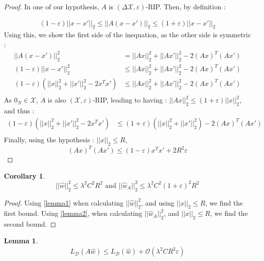 \documentclass{article}
\newtheorem{corollary}{Corollary}[theorem]
\newtheorem{lemma}[theorem]{Lemma}
\begin{document}
    \begin{proof}
        In one of our hypothesis, $A$ is $(\Delta \mathcal{X}, \varepsilon)$-RIP. 
        Then, by definition : 

        \begin{align*}
            (1-\varepsilon) ||x-x'||_2 
            \leq ||A(x-x')||_2
            \leq (1+\varepsilon) ||x-x'||_2 
        \end{align*}
        Using this, we show the first side of the inequation, 
        as the other side is symmetric :
        \begin{align*}
            ||A(x-x')||_2^2 &= ||Ax||^2_2  + ||Ax'||^2_2 - 2 (Ax)^T(Ax') \\
            (1-\varepsilon) ||x-x'||^2_2 &\leq ||Ax||^2_2  + ||Ax'||^2_2 - 2 (Ax)^T(Ax') \\
            (1-\varepsilon) (||x||^2_2+||x'||^2_2 -2x^T x') 
            &\leq ||Ax||^2_2  + ||Ax'||^2_2 - 2 (Ax)^T(Ax') \\
        \end{align*}
        As $0_N \in \mathcal{X}$, $A$ is also $(\mathcal{X},
         \varepsilon)$-RIP, leading to having :
        $||Ax||^2_2 \leq (1+\varepsilon)||x||^2_2$, and thus :
        \begin{align*}
            (1-\varepsilon) (||x||^2_2+||x'||^2_2 -2x^T x') 
            &\leq (1+\varepsilon)(||x||^2_2  + ||x'||^2_2) - 2 (Ax)^T(Ax') \\
        \end{align*}
        Finally, using the hypothesis : $||x||_2 \leq R$, 
        \[  (Ax)^T(Ax') \leq (1-\varepsilon)x^Tx' + 2R^2\varepsilon \]
    \end{proof}
    \begin{corollary}
        \[
            ||\hat{w}||_2^2 
            \leq \lambda^2 C^2 R^2 \text{ and }
            ||\hat{w}_A||_2^2 
            \leq \lambda^2 C^2 (1+\varepsilon)^2 R^2
        \]
    \end{corollary}
    \begin{proof} \label{corollary1}
        Using \ref{lemma1} when calculating $||\hat{w}||_2^2$, and using
        $||x||_2\leq R$, we find the first bound. Using \ref{lemma2}, when 
        calculating $||\hat{w}_A||_2^2$, and $||x||_2\leq R$, we find the 
        second bound.
    \end{proof}
    \begin{lemma}\label{lemma3}
        \begin{align*}
             L_{\mathcal{D}} (A\hat{w}) \leq 
             L_{\mathcal{D}}(\hat{w}) + \mathcal{O}(\lambda^2 C R^2 \varepsilon)
        \end{align*}
    \end{lemma}
\end{document}
